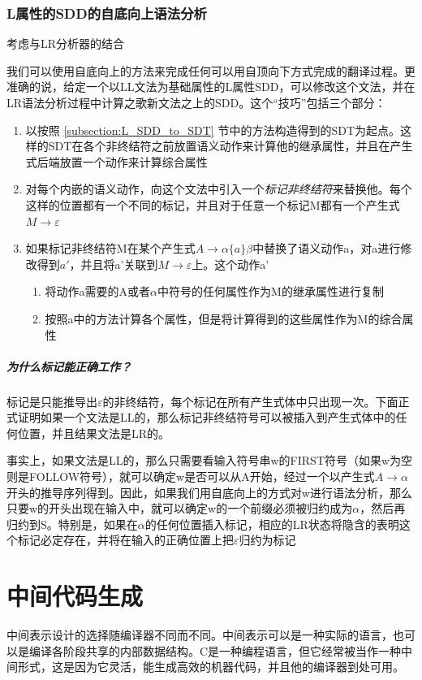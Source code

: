 \documentclass[]{report}
\begin{document}
		\subsection{L属性的SDD的自底向上语法分析}
		考虑与LR分析器的结合\par
		我们可以使用自底向上的方法来完成任何可以用自顶向下方式完成的翻译过程。更准确的说，给定一个以LL文法为基础属性的L属性SDD，可以修改这个文法，并在LR语法分析过程中计算之歌新文法之上的SDD。这个“技巧”包括三个部分：
		\begin{enumerate}
			\item 以按照 \ref{subsection:L_SDD_to_SDT} 节中的方法构造得到的SDT为起点。这样的SDT在各个非终结符之前放置语义动作来计算他的继承属性，并且在产生式后端放置一个动作来计算综合属性
			\item 对每个内嵌的语义动作，向这个文法中引入一个\textit{标记非终结符}来替换他。每个这样的位置都有一个不同的标记，并且对于任意一个标记M都有一个产生式$M\to\varepsilon$
			\item 如果标记非终结符M在某个产生式$A\to\alpha\{a\}\beta$中替换了语义动作a，对a进行修改得到$a'$，并且将a'关联到$M\to\varepsilon$上。这个动作a'
			\begin{enumerate}
				\item 将动作a需要的A或者$\alpha$中符号的任何属性作为M的继承属性进行复制
				\item 按照a中的方法计算各个属性，但是将计算得到的这些属性作为M的综合属性
			\end{enumerate}
		\end{enumerate}
		\paragraph{为什么标记能正确工作？}
		标记是只能推导出$\varepsilon$的非终结符，每个标记在所有产生式体中只出现一次。下面正式证明如果一个文法是LL的，那么标记非终结符号可以被插入到产生式体中的任何位置，并且结果文法是LR的。\par
		事实上，如果文法是LL的，那么只需要看输入符号串w的FIRST符号（如果w为空则是FOLLOW符号），就可以确定w是否可以从A开始，经过一个以产生式$A\to\alpha$开头的推导序列得到。因此，如果我们用自底向上的方式对w进行语法分析，那么只要w的开头出现在输入中，就可以确定w的一个前缀必须被归约成为$\alpha$，然后再归约到S。特别是，如果在$\alpha$的任何位置插入标记，相应的LR状态将隐含的表明这个标记必定存在，并将在输入的正确位置上把$\varepsilon$归约为标记

	\chapter{中间代码生成}
	中间表示设计的选择随编译器不同而不同。中间表示可以是一种实际的语言，也可以是编译各阶段共享的内部数据结构。C是一种编程语言，但它经常被当作一种中间形式，这是因为它灵活，能生成高效的机器代码，并且他的编译器到处可用。
\end{document}
